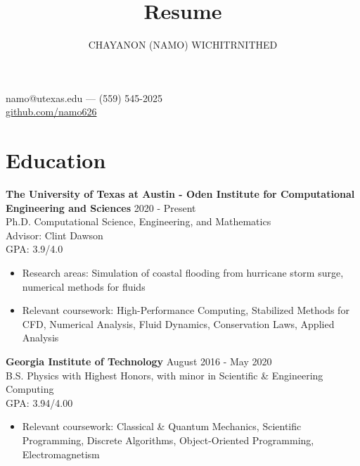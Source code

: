 \documentclass[10pt]{article}
\makeatletter
\renewcommand{\maketitle}{
  \begin{center}
    {\Large\bfseries\theauthor}

    namo@utexas.edu --- (559) 545-2025 \\
    \url{github.com/namo626}
  \end{center}
}
\newenvironment{body}{}
\makeatother
\begin{document}
\title{Resume}
\author{CHAYANON (NAMO) WICHITRNITHED}
\maketitle

\section{Education}
\begin{body}
  \textbf{The University of Texas at Austin - Oden Institute for Computational Engineering and Sciences} \hfill 2020 - Present \\
   Ph.D. Computational Science, Engineering, and Mathematics \\
   Advisor: Clint Dawson \\
    GPA: 3.9/4.0
  \begin{itemize}[leftmargin=*,topsep=0pt]
    \setlength\itemsep{-0.3em}
    \item Research areas: Simulation of coastal flooding from hurricane storm surge, numerical methods for fluids
    \item Relevant coursework: High-Performance Computing, Stabilized Methods for CFD, Numerical Analysis, Fluid Dynamics, Conservation Laws, Applied Analysis
  \end{itemize}
  \medskip
\noindent
  \textbf{Georgia Institute of Technology} \hfill August 2016 - May 2020 \\
  B.S. Physics with Highest Honors, with minor in Scientific \& Engineering Computing \\
  GPA: 3.94/4.00
  \begin{itemize}[leftmargin=*,topsep=0pt]
    \setlength\itemsep{-0.3em}
  \item Relevant coursework: Classical \& Quantum Mechanics, Scientific Programming, Discrete Algorithms, Object-Oriented Programming, Electromagnetism
  \end{itemize}
\end{body}
\end{document}
